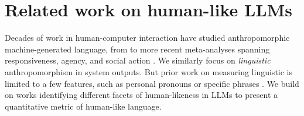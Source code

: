 \section{Related work on human-like LLMs}
Decades of work in human-computer interaction have studied anthropomorphic machine-generated language, from \citet{quintanar1982interactive,shneidermandumpty} to more recent meta-analyses spanning responsiveness, agency, and social action \cite{Emnett2024-na,Araujo2018-ij}. We similarly focus on \textit{linguistic} anthropomorphism in system outputs.
But prior work on measuring linguistic \ant is limited to a few features, such as personal pronouns or specific phrases \cite{shneidermandumpty,quintanar1982interactive,Cohn2024-fc}.
We build on works identifying different facets of human-likeness in LLMs \cite{Glaese2022-qo,abercrombie2023mirages,li-etal-2024-pixels} to present a quantitative metric of human-like language.